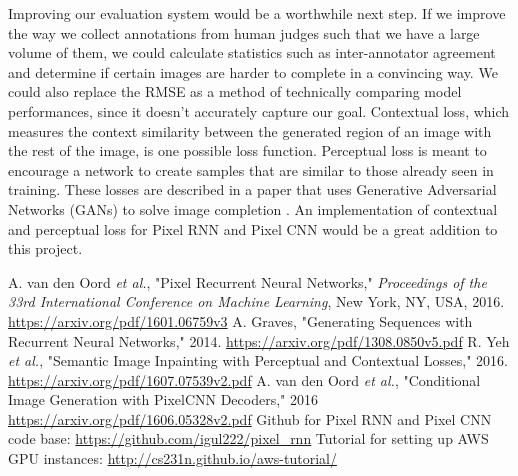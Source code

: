 \documentclass[10pt,twocolumn,letterpaper]{article}
\begin{document}
Improving our evaluation system would be a worthwhile next step. If we improve the way we collect annotations from human judges such that we have a large volume of them, we could calculate statistics such as inter-annotator agreement and determine if certain images are harder to complete in a convincing way. We could also replace the RMSE as a method of technically comparing model performances, since it doesn't accurately capture our goal. Contextual loss, which measures the context similarity between the generated region of an image with the rest of the image, is one possible loss function. Perceptual loss is meant to encourage a network to create samples that are similar to those already seen in training. These losses are described in a paper that uses Generative Adversarial Networks (GANs) to solve image completion \cite{inpaint}. An implementation of contextual and perceptual loss for Pixel RNN and Pixel CNN would be a great addition to this project. \\

\begin{thebibliography}{1}
 A. van den Oord \textit{et al.}, "Pixel Recurrent Neural Networks," \textit{Proceedings of the 33rd International Conference on Machine Learning}, New York, NY, USA, 2016. \url{https://arxiv.org/pdf/1601.06759v3}
 A. Graves, "Generating Sequences with Recurrent Neural Networks," 2014. \url{https://arxiv.org/pdf/1308.0850v5.pdf}
 R. Yeh \textit{et al.}, "Semantic Image Inpainting with Perceptual and Contextual Losses," 2016. \url{https://arxiv.org/pdf/1607.07539v2.pdf}
 A. van den Oord \textit{et al.}, "Conditional Image Generation with PixelCNN Decoders," 2016 \url{https://arxiv.org/pdf/1606.05328v2.pdf}
 Github for Pixel RNN and Pixel CNN code base: \url{https://github.com/igul222/pixel_rnn}
 Tutorial for setting up AWS GPU instances: \url{http://cs231n.github.io/aws-tutorial/}
\end{thebibliography}
\end{document}
